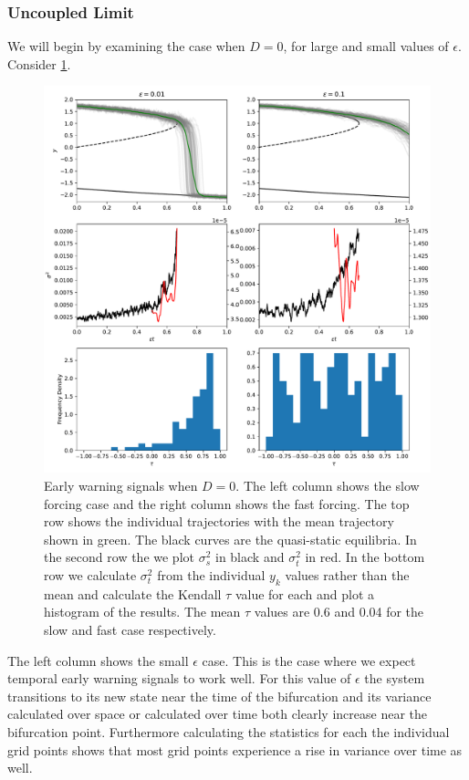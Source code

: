 \subsubsection{Uncoupled Limit}
We will  begin by examining the case when $D = 0$, for large and small values of $\epsilon$. Consider \cref{fig:uncoupled_timeseries}.
\begin{figure}
  \centering
  \includegraphics[width=\textwidth,keepaspectratio]{uncoupled_variance}
  \caption[Early warning signals in the uncoupled limit]{Early warning signals when $D = 0$. The left column shows the slow forcing case and the right column shows the fast forcing.
    The top row shows the individual trajectories with the mean trajectory shown in green. The black curves are the quasi-static equilibria.
    In the second row the we plot $\sigma_s^2$ in black and $\sigma_t^2$ in red. In the bottom row we calculate $\sigma_t^2$ from the individual
    $y_k$ values rather than the mean and calculate the Kendall $\tau$ value for each and plot a histogram of the results. The mean $\tau$ values
                are 0.6 and 0.04 for the slow and fast case respectively.}
  \label{fig:uncoupled_timeseries}
\end{figure}
 The left column shows the small $\epsilon$ case. This is the case
    where we expect temporal early warning signals to work well. For this value of $\epsilon$ the system
    transitions to its new state near the time of the bifurcation and its variance calculated over
    space or calculated over time both clearly increase near the bifurcation point. Furthermore
    calculating the statistics for each the individual grid points shows that most grid points 
    experience a rise in variance over time as well.


